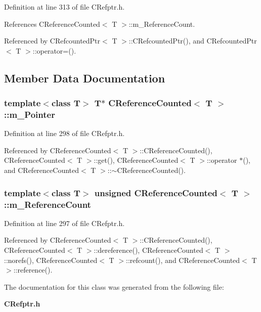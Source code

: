 Definition at line 313 of file CRefptr.h.

References CReference\-Counted$<$ T $>$::m\_\-Reference\-Count.

Referenced by CRefcounted\-Ptr$<$ T $>$::CRefcounted\-Ptr(), and CRefcounted\-Ptr$<$ T $>$::operator=().

\subsection{Member Data Documentation}
\subsubsection{\setlength{\rightskip}{0pt plus 5cm}template$<$class T$>$ T$\ast$ CReference\-Counted$<$ T $>$::m\_\-Pointer\hspace{0.3cm}{\tt  [private]}}\label{classCReferenceCounted_o1}




Definition at line 298 of file CRefptr.h.

Referenced by CReference\-Counted$<$ T $>$::CReference\-Counted(), CReference\-Counted$<$ T $>$::get(), CReference\-Counted$<$ T $>$::operator $\ast$(), and CReference\-Counted$<$ T $>$::$\sim$CReference\-Counted().
\subsubsection{\setlength{\rightskip}{0pt plus 5cm}template$<$class T$>$ unsigned CReference\-Counted$<$ T $>$::m\_\-Reference\-Count\hspace{0.3cm}{\tt  [private]}}\label{classCReferenceCounted_o0}




Definition at line 297 of file CRefptr.h.

Referenced by CReference\-Counted$<$ T $>$::CReference\-Counted(), CReference\-Counted$<$ T $>$::dereference(), CReference\-Counted$<$ T $>$::norefs(), CReference\-Counted$<$ T $>$::refcount(), and CReference\-Counted$<$ T $>$::reference().

The documentation for this class was generated from the following file:\begin{CompactItemize}
\item 
{\bf CRefptr.h}\end{CompactItemize}
